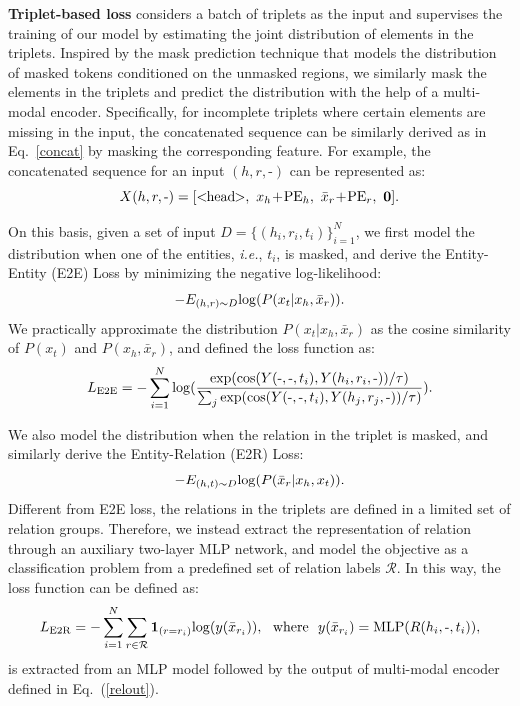 \textbf{Triplet-based loss} considers a batch of triplets as the input and supervises the training of our model by estimating the joint distribution of elements in the triplets. Inspired by the mask prediction technique that models the distribution of masked tokens conditioned on the unmasked regions, we similarly mask the elements in the triplets and predict the distribution with the help of a multi-modal encoder. Specifically, for incomplete triplets where certain elements are missing in the input, the concatenated sequence can be similarly derived as in Eq.~\ref{concat} by masking the corresponding feature. For example, the concatenated sequence for an input $(h, r, \text{-})$ can be represented as:
\begin{equation}
    X(h, r, \text{-}) = [<\!\!{\rm head}\!\!>, \ x_h\!+\!{\rm PE}_h, \ \bar{x}_r\!+\!{\rm PE}_r, \ \textbf{0}].
\end{equation}

On this basis, given a set of input $D = \{(h_i, r_i, t_i)\}_{i=1}^N$, we first model the distribution when one of the entities, \textit{i.e.}, $t_i$, is masked, and derive the Entity-Entity (E2E) Loss by minimizing the negative log-likelihood:
\begin{equation}
\label{nll}
    -E_{(h,r)\sim D}{\rm log}(P(x_t|x_h,\bar{x}_r)).
\end{equation}
We practically approximate the distribution $P(x_t|x_h,\bar{x}_r)$ as the cosine similarity of $P(x_t)$ and $P(x_h,\bar{x}_r)$, and defined the loss function as:
\begin{align}
    L_{\rm E2E} = -\sum_{i=1}^N{\rm log}(\frac{{\rm exp} ({\rm cos}(Y(\text{-},\text{-},t_i), Y(h_i,r_i,\text{-}))/\tau)}{\sum_j {\rm exp} ({\rm cos}(Y(\text{-},\text{-},t_i), Y(h_j,r_j,\text{-}))/\tau)}).
\end{align}

We also model the distribution when the relation in the triplet is masked, and similarly derive the Entity-Relation (E2R) Loss:
\begin{equation}
    -E_{(h,t)\sim D}{\rm log}(P(\bar{x}_r|x_h,x_t)).
\end{equation}
Different from E2E loss, the relations in the triplets are defined in a limited set of relation groups. Therefore, we instead extract the representation of relation through an auxiliary two-layer MLP network, and model the objective as a classification problem from a predefined set of relation labels $\mathcal{R}$. In this way, the loss function can be defined as:
\begin{equation}
    L_{\rm E2R} = -\sum_{i=1}^N \sum_{r\in \mathcal{R}} \mathbf{1}_{(r=r_i)} {\rm log}(y(\bar{x}_{r_i})), \ \ {\rm where} \ \  y(\bar{x}_{r_i}) = {\rm MLP}(R(h_i,\text{-},t_i)),
\end{equation}
is extracted from an MLP model followed by the output of multi-modal encoder defined in Eq.~(\ref{relout}).

